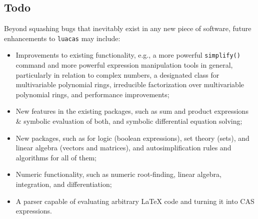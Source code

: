 \documentclass{article}
\begin{document}
\subsection{Todo}

Beyond squashing bugs that inevitably exist in any new piece of software, future enhancements to \texttt{luacas} may include:
\begin{itemize}
    \item Improvements to existing functionality, e.g., a more powerful \texttt{simplify()} command and more powerful expression manipulation tools in general, particularly in relation to complex numbers, a designated class for multivariable polynomial rings, irreducible factorization over multivariable polynomial rings, and performance improvements;
    \item New features in the existing packages, such as sum and product expressions \& symbolic evaluation of both, and symbolic differential equation solving;
    \item New packages, such as for logic (boolean expressions), set theory (sets), and linear algebra (vectors and matrices), and autosimplification rules and algorithms for all of them;
    \item Numeric functionality, such as numeric root-finding, linear algebra, integration, and differentiation;
    \item A parser capable of evaluating arbitrary \LaTeX{} code and turning it into CAS expressions.
\end{itemize}
\end{document}
